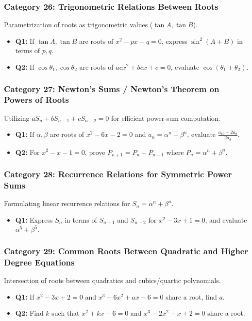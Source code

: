 \documentclass[10pt,a4paper]{article}
\begin{document}
\subsubsection{Category 26: Trigonometric Relations Between Roots}
Parametrization of roots as trigonometric values ($\tan A, \tan B$).
\begin{itemize}[leftmargin=*]
    \item \textbf{Q1:} If $\tan A, \tan B$ are roots of $x^2 - px + q = 0$, express $\sin^2(A+B)$ in terms of $p, q$.
    \item \textbf{Q2:} If $\cos\theta_1, \cos\theta_2$ are roots of $acx^2 + bcx + c = 0$, evaluate $\cos(\theta_1 + \theta_2)$.
\end{itemize}

\subsubsection{Category 27: Newton's Sums / Newton's Theorem on Powers of Roots}
Utilizing $a S_n + b S_{n-1} + c S_{n-2} = 0$ for efficient power-sum computation.
\begin{itemize}[leftmargin=*]
    \item \textbf{Q1:} If $\alpha, \beta$ are roots of $x^2 - 6x - 2 = 0$ and $a_n = \alpha^n - \beta^n$, evaluate $\frac{a_{10} - 2a_8}{2a_9}$.
    \item \textbf{Q2:} For $x^2 - x - 1 = 0$, prove $P_{n+1} = P_n + P_{n-1}$ where $P_n = \alpha^n + \beta^n$.
\end{itemize}

\subsubsection{Category 28: Recurrence Relations for Symmetric Power Sums}
Formulating linear recurrence relations for $S_n = \alpha^n + \beta^n$.
\begin{itemize}[leftmargin=*]
    \item \textbf{Q1:} Express $S_n$ in terms of $S_{n-1}$ and $S_{n-2}$ for $x^2 - 3x + 1 = 0$, and evaluate $\alpha^5 + \beta^5$.
\end{itemize}

\subsubsection{Category 29: Common Roots Between Quadratic and Higher Degree Equations}
Intersection of roots between quadratics and cubics/quartic polynomials.
\begin{itemize}[leftmargin=*]
    \item \textbf{Q1:} If $x^2 - 3x + 2 = 0$ and $x^3 - 6x^2 + ax - 6 = 0$ share a root, find $a$.
    \item \textbf{Q2:} Find $k$ such that $x^2 + kx - 6 = 0$ and $x^3 - 2x^2 - x + 2 = 0$ share a root.
\end{itemize}
\end{document}
